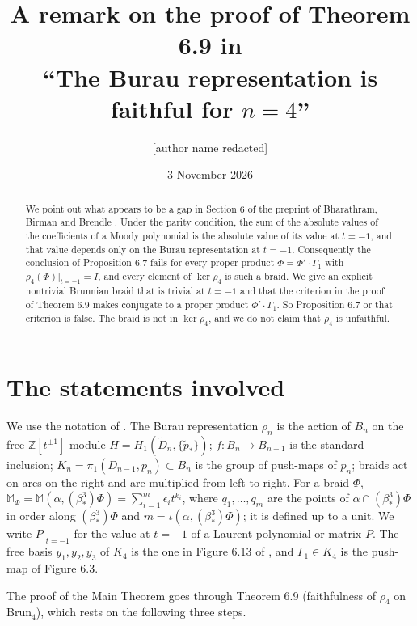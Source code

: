 \documentclass[11pt]{amsart}
\title[A remark on Section 6 of arXiv:2607.05283]{A remark on the proof of Theorem 6.9 in\\ ``The Burau representation is faithful for $n=4$''}
\author{[author name redacted]}
\date{3 November 2026}
\theoremstyle{remark}
\newcommand{\M}{\mathbb{M}}
\newcommand{\Brun}{\mathrm{Brun}}
\newcommand{\bs}{\beta^3_*}
\newcommand{\at}{\big|_{t=-1}}
\begin{document}
\begin{abstract}
We point out what appears to be a gap in Section 6 of the preprint of Bharathram, Birman and Brendle \cite{BBB}. Under the parity condition, the sum of the absolute values of the coefficients of a Moody polynomial is the absolute value of its value at $t=-1$, and that value depends only on the Burau representation at $t=-1$. Consequently the conclusion of Proposition 6.7 fails for every proper product $\Phi=\Phi'\cdot\Gamma_1$ with $\rho_4(\Phi)\at=I$, and every element of $\ker\rho_4$ is such a braid. We give an explicit nontrivial Brunnian braid that is trivial at $t=-1$ and that the criterion in the proof of Theorem 6.9 makes conjugate to a proper product $\Phi'\cdot\Gamma_1$. So Proposition 6.7 or that criterion is false. The braid is not in $\ker\rho_4$, and we do not claim that $\rho_4$ is unfaithful.
\end{abstract}

\maketitle

\section{The statements involved}

We use the notation of \cite{BBB}. The Burau representation $\rho_n$ is the action of $B_n$ on the free $\mathbb{Z}[t^{\pm1}]$-module $H=H_1(\widetilde D_n,\{\tilde p_*\})$; $f\colon B_n\to B_{n+1}$ is the standard inclusion; $K_n=\pi_1(D_{n-1},p_n)\subset B_n$ is the group of push-maps of $p_n$; braids act on arcs on the right and are multiplied from left to right. For a braid $\Phi$, $\M_\Phi=\M(\alpha,(\bs)\Phi)=\sum_{i=1}^m\epsilon_i t^{k_i}$, where $q_1,\dots,q_m$ are the points of $\alpha\cap(\bs)\Phi$ in order along $(\bs)\Phi$ and $m=\iota(\alpha,(\bs)\Phi)$; it is defined up to a unit. We write $P\at$ for the value at $t=-1$ of a Laurent polynomial or matrix $P$. The free basis $y_1,y_2,y_3$ of $K_4$ is the one in Figure 6.13 of \cite{BBB}, and $\Gamma_1\in K_4$ is the push-map of Figure 6.3.

The proof of the Main Theorem goes through Theorem 6.9 (faithfulness of $\rho_4$ on $\Brun_4$), which rests on the following three steps.
\end{document}
